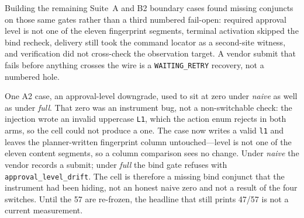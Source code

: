 
Building the remaining Suite~A and B2 boundary cases found missing
conjuncts on those same gates rather than a third numbered fail-open:
required approval level is not one of the eleven fingerprint segments,
terminal activation skipped the bind recheck, delivery still took the
command locator as a second-site witness, and verification did not
cross-check the observation target.
A vendor submit that fails before anything crosses the wire is a
\texttt{WAITING\_RETRY} recovery, not a numbered hole.


One A2 case, an approval-level downgrade, used to sit at zero under
\emph{naive} as well as under \emph{full}. That zero was an instrument
bug, not a non-switchable check: the injection wrote an invalid
uppercase \texttt{L1}, which the action enum rejects in both arms, so
the cell could not produce a one. The case now writes a valid
\texttt{l1} and leaves the planner-written fingerprint column
untouched---level is not one of the eleven content segments, so a
column comparison sees no change. Under \emph{naive} the vendor records
a submit; under \emph{full} the bind gate refuses with
\texttt{approval\_level\_drift}. The cell is therefore a missing bind
conjunct that the instrument had been hiding, not an honest naive zero
and not a result of the four switches. Until the 57 are re-frozen, the
headline that still prints 47/57 is not a current measurement.


